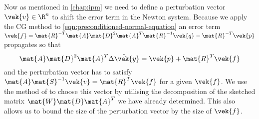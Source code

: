Now as mentioned in \cref{chap:ipm} we need to define a perturbation vector \(\vek{v} \in \R^n\) to shift the error term in the Newton system.
Because we apply the CG method to \cref{eqn:preconditioned-normal-equation} an error term \(\vek{f} = \mat{R}^{-T}\mat{A}\mat{D}^2\mat{A}^T\mat{R}^{-1}\vek{q} - \mat{R}^{-T}\vek{p}\) propagates so that
\begin{equation}
  \mat{A} \mat{D}^2 \mat{A}^T \hat{\Delta\vek{y}} = \vek{p} + \mat{R}^T\vek{f}
\end{equation}
and the perturbation vector has to satisfy \(\mat{A}\mat{S}^{-1}\vek{v} = \mat{R}^T \vek{f}\) for a given \(\vek{f}\).
We use the method of \textcite{Avron-FasterRandomizedInfeasibleIPMs} to choose this vector by utilising the decomposition of the sketched matrix \(\mat{W}\mat{D}\mat{A}^T\) we have already determined.
This also allows us to bound the size of the perturbation vector by the size of \(\vek{f}\).

